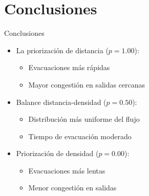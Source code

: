 \documentclass[aspectratio=169]{beamer}
\begin{document}
\section{Conclusiones}

\begin{frame}{Conclusiones}
    \begin{itemize}
        \item La priorización de distancia ($p=1.00$):
        \begin{itemize}
            \item Evacuaciones más rápidas
            \item Mayor congestión en salidas cercanas
        \end{itemize}
        \item Balance distancia-densidad ($p=0.50$):
        \begin{itemize}
            \item Distribución más uniforme del flujo
            \item Tiempo de evacuación moderado
        \end{itemize}
        \item Priorización de densidad ($p=0.00$):
        \begin{itemize}
            \item Evacuaciones más lentas
            \item Menor congestión en salidas
        \end{itemize}
    \end{itemize}
\end{frame}
\end{document}
